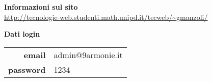 
\vspace{3em}

\begin{center}
\textbf{Informazioni sul sito} \\ 
\vspace{0.5em}
 \small \url{http://tecnologie-web.studenti.math.unipd.it/tecweb/~gmanzoli/} \\
\end{center}

\begin{center}
\textbf{Dati login} \\ \vspace{0.5em}
\small
\begin{tabular}{r|l}
	\textbf{email} & admin@9armonie.it \\
	\textbf{password} & 1234\\
\end{tabular}
\end{center}

\normalsize